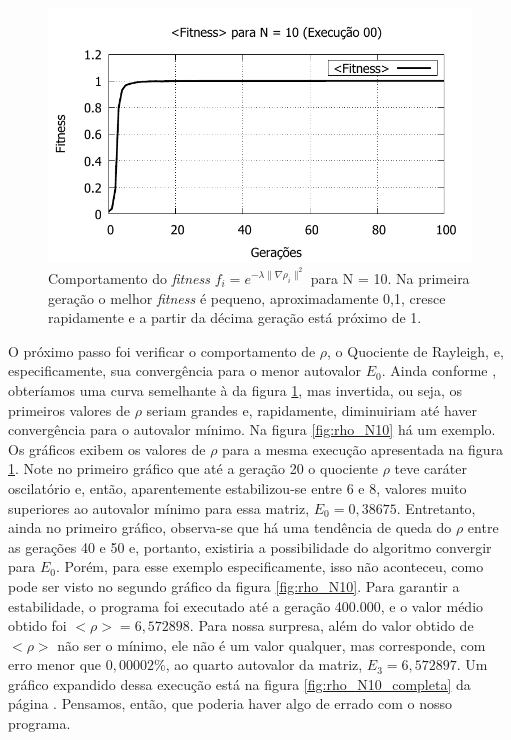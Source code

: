 	\begin{figure}[htbp]
		\centering
			\includegraphics{figs/resultados/fitnessGrad/N10_00_fitness.pdf}
			\caption{Comportamento do \textsl{fitness} $f_i = e^{-\lambda \| \nabla \rho_i \|^2}$ para N = 10. Na primeira geração o melhor \textit{fitness} é pequeno, aproximadamente 0,1, cresce rapidamente e a partir da décima geração está próximo de 1.}
		\label{fig:compFitnessTipo1N10}
	\end{figure}
	
	O próximo passo foi verificar o comportamento de $\rho$, o Quociente de Rayleigh, e, especificamente, sua convergência para o menor autovalor $E_0$. Ainda conforme \cite{metodo2004}, obteríamos uma curva semelhante à da figura \ref{fig:compFitnessTipo1N10}, mas invertida, ou seja, os primeiros valores de $\rho$ seriam grandes e, rapidamente, diminuiriam até haver convergência para o autovalor mínimo. Na figura \ref{fig:rho_N10} há um exemplo.	Os gráficos exibem os valores de $\rho$ para a mesma execução apresentada na figura \ref{fig:compFitnessTipo1N10}. Note no primeiro gráfico que até a geração 20 o quociente $\rho$ teve caráter oscilatório e, então, aparentemente estabilizou-se entre 6 e 8, valores muito superiores ao autovalor mínimo para essa matriz, $E_0 = 0,38675$. Entretanto, ainda no primeiro gráfico, observa-se que há uma tendência de queda do $\rho$ entre as gerações 40 e 50 e, portanto, existiria a possibilidade do algoritmo convergir para $E_0$. Porém, para esse exemplo especificamente, isso não aconteceu, como pode ser visto no segundo gráfico da figura \ref{fig:rho_N10}. Para garantir a estabilidade, o programa foi executado até a geração 400.000, e o valor médio obtido foi $<\rho> = 6,572898$. Para nossa surpresa, além do valor obtido de $<\rho>$ não ser o mínimo, ele não é um valor qualquer, mas corresponde, com erro menor que $0,00002\%$, ao quarto autovalor da matriz, $E_3 = 6,572897$. Um gráfico expandido dessa execução está na figura \ref{fig:rho_N10_completa} da página \pageref{fig:rho_N10_completa}. Pensamos, então, que poderia haver algo de errado com o nosso programa. 
	
